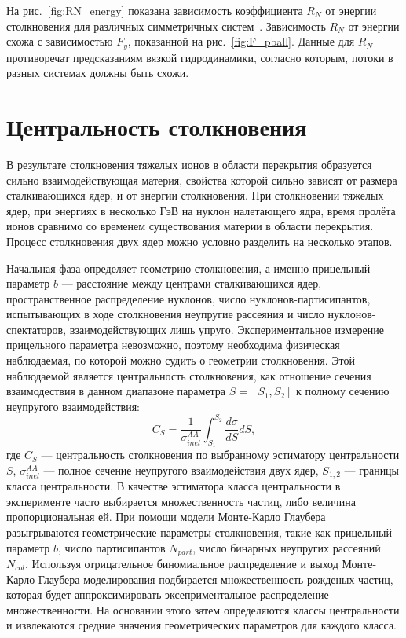 На рис.~\ref{fig:RN_energy} показана зависимость коэффициента $R_N$ от энергии столкновения для различных симметричных систем~\cite{Gustafsson:1984qh}.
Зависимость $R_N$ от энергии схожа с зависимостью $F_y$, показанной на рис.~\ref{fig:F_pball}. 
Данные для $R_N$ противоречат предсказаниям вязкой гидродинамики, согласно которым, потоки в разных системах должны быть схожи.

\section{Центральность столкновения}

В результате столкновения тяжелых ионов в области перекрытия образуется сильно взаимодействующая материя, свойства которой сильно зависят от размера сталкивающихся ядер, и от энергии столкновения.
При столкновении тяжелых ядер, при энергиях в несколько ГэВ на нуклон налетающего ядра, время пролёта ионов сравнимо со временем существования материи в области перекрытия.
Процесс столкновения двух ядер можно условно разделить на несколько этапов.

Начальная фаза определяет геометрию столкновения, а именно прицельный параметр $b$ --- расстояние между центрами сталкивающихся ядер, пространственное распределение нуклонов, число нуклонов-партисипантов, испытывающих в ходе столкновения неупругие рассеяния и число нуклонов-спектаторов, взаимодействующих лишь упруго.  
Экспериментальное измерение прицельного параметра невозможно, поэтому необходима физическая наблюдаемая, по которой можно судить о геометрии столкновения.
Этой наблюдаемой является центральность столкновения, как отношение сечения взаимодествия в данном диапазоне параметра $S=[S_1, S_2]$ к полному сечению неупругого взаимодействия:
%
\begin{equation}
    C_S = \frac{1}{ \sigma_{inel}^{AA} } \int_{S_1}^{S_2} \frac{d\sigma}{dS}dS,
\end{equation}
где $C_S$ --- центральность столкновения по выбранному эстиматору центральности $S$, $\sigma_{inel}^{AA}$ --- полное сечение неупругого взаимодействия двух ядер, $S_{1,2}$ --- границы класса центральности.
В качестве эстиматора класса центральности в эксперименте часто выбирается множественность частиц, либо величина пропорциональная ей.
При помощи модели Монте-Карло Глаубера~\cite{Miller:2007ri} разыгрываются геометрические параметры столкновения, такие как прицельный параметр $b$, число партисипантов $N_{part}$, число бинарных неупругих рассеяний $N_{col}$.
Используя отрицательное биномиальное распределение и выход Монте-Карло Глаубера моделирования подбирается множественность рожденых частиц, которая будет аппроксимировать эксеприментальное распределение множественности.
На основании этого затем определяются классы центральности и извлекаются средние значения геометрических параметров для каждого класса.

